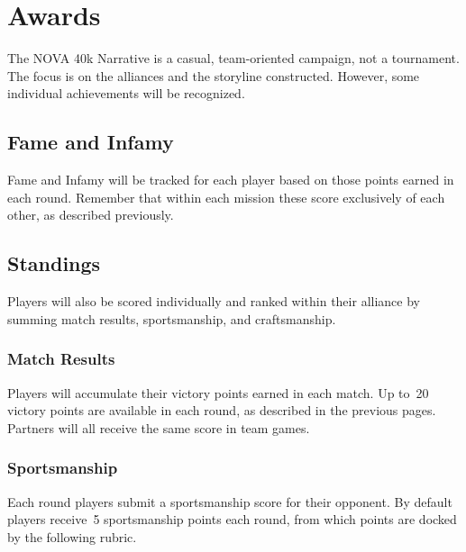 \makeatletter\@openrightfalse
\chapter{Awards}
\@openrighttrue\makeatother

The NOVA 40k Narrative is a casual, team-oriented campaign, not a
tournament.  The focus is on the alliances and the storyline
constructed.  However, some individual achievements will be
recognized.

\section{Fame and Infamy}

Fame and Infamy will be tracked for each player based on those points
earned in each round.  Remember that within each mission these score
exclusively of each other, as described previously.

\section{Standings}

Players will also be scored individually and ranked within their alliance
by summing match results, sportsmanship, and craftsmanship.

\subsection{Match Results}

Players will accumulate their victory points earned in each match.  Up
to~20 victory points are available in each round, as described in the
previous pages.  Partners will all receive the same score in team
games.

\subsection{Sportsmanship}

Each round players submit a sportsmanship score for their opponent.
By default players receive~5 sportsmanship points each round, from
which points are docked by the following rubric.

